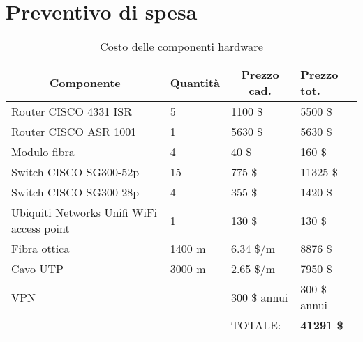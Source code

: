 \documentclass[a4paper,11pt]{article}
\begin{document}
\section{Preventivo di spesa}
\begin{table}[]
\centering
\label{costo componentistica}
\begin{tabular}{ll|l|l|}
\hline
\multicolumn{1}{|c|}{\textbf{Componente}} & \multicolumn{1}{c|}{\textbf{Quantità}} & \multicolumn{1}{c|}{\textbf{Prezzo cad.}} & \textbf{Prezzo tot.} \\ \hline
\multicolumn{1}{|l|}{Router CISCO 4331 ISR} & 5 & 1100 \$ & 5500 \$ \\ \hline
\multicolumn{1}{|l|}{Router CISCO ASR 1001} & 1 & 5630 \$ & 5630 \$ \\ \hline
\multicolumn{1}{|l|}{Modulo fibra} & 4 & 40 \$ & 160 \$ \\ \hline
\multicolumn{1}{|l|}{Switch CISCO SG300-52p} & 15 & 775 \$ & 11325 \$ \\ \hline
\multicolumn{1}{|l|}{Switch CISCO SG300-28p} & 4 & 355 \$ & 1420 \$ \\ \hline
\multicolumn{1}{|l|}{Ubiquiti Networks Unifi WiFi access point} & 1 & 130 \$ & 130 \$ \\ \hline
\multicolumn{1}{|l|}{Fibra ottica} & 1400 m & 6.34 \$/m & 8876 \$ \\ \hline
\multicolumn{1}{|l|}{Cavo UTP} & 3000 m & 2.65 \$/m & 7950 \$ \\ \hline
\multicolumn{1}{|l|}{VPN} &  & 300 \$ annui & 300 \$ annui \\ \hline
 &  & TOTALE: & \textbf{41291 \$} \\ \cline{3-4} 
\end{tabular}
\caption{Costo delle componenti hardware}
\end{table}
\end{document}
